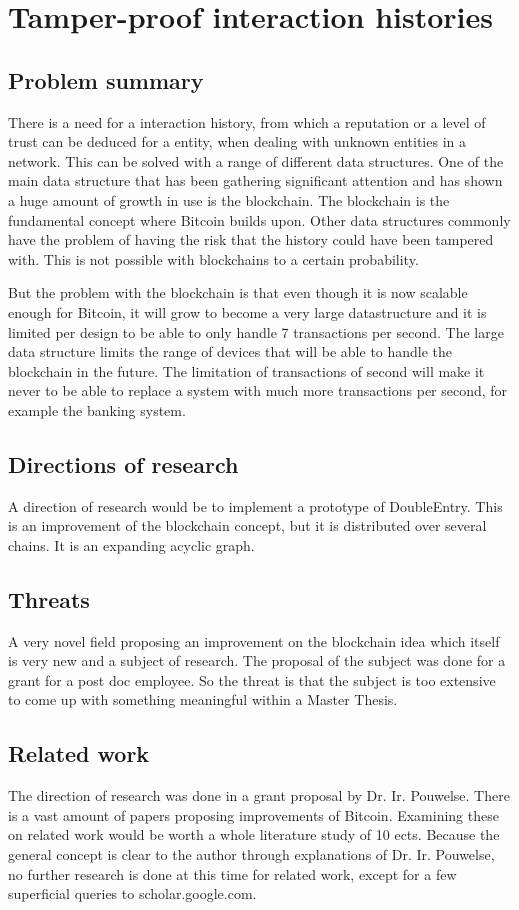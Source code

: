 \section{Tamper-proof interaction histories}

\subsection*{Problem summary}
There is a need for a interaction history, from which a reputation or a level of trust can be deduced for a entity, when dealing with unknown entities in a network.
This can be solved with a range of different data structures.
One of the main data structure that has been gathering significant attention and has shown a huge amount of growth in use is the blockchain.
The blockchain is the fundamental concept where Bitcoin builds upon.
Other data structures commonly have the problem of having the risk that the history could have been tampered with.
This is not possible with blockchains to a certain probability.

But the problem with the blockchain is that even though it is now scalable enough for Bitcoin,
it will grow to become a very large datastructure and it is limited per design to be able to only handle 7 transactions per second.
The large data structure limits the range of devices that will be able to handle the blockchain in the future.
The limitation of transactions of second will make it never to be able to replace a system with much more transactions per second,
for example the banking system.

\subsection*{Directions of research}
A direction of research would be to implement a prototype of DoubleEntry.
This is an improvement of the blockchain concept,
but it is distributed over several chains. 
It is an expanding acyclic graph.

\subsection*{Threats}
A very novel field proposing an improvement on the blockchain idea which itself is very new and a subject of research.
The proposal of the subject was done for a grant for a post doc employee.
So the threat is that the subject is too extensive to come up with something meaningful within a Master Thesis.

\subsection*{Related work}
The direction of research was done in a grant proposal by Dr. Ir. Pouwelse.
There is a vast amount of papers proposing improvements of Bitcoin.
Examining these on related work would be worth a whole literature study of 10 ects.
Because the general concept is clear to the author through explanations of Dr. Ir. Pouwelse,
no further research is done at this time for related work,
except for a few superficial queries to scholar.google.com.
